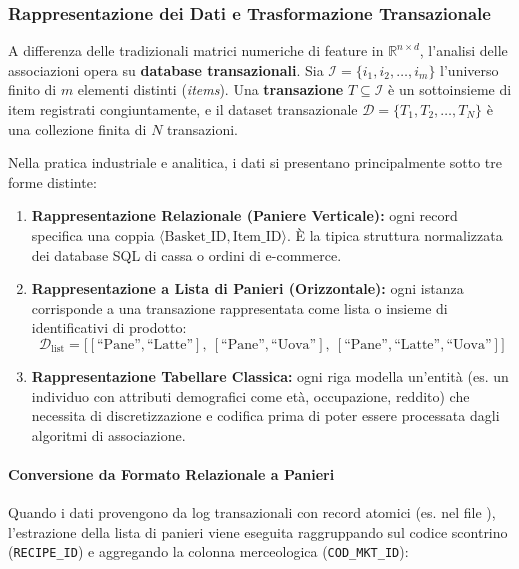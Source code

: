 \FloatBarrier
\subsubsection{Rappresentazione dei Dati e Trasformazione Transazionale}
\label{subsec:lab-data-representation}

A differenza delle tradizionali matrici numeriche di feature in $\mathbb{R}^{n \times d}$, l'analisi delle associazioni opera su \textbf{database transazionali}. Sia $\mathcal{I} = \{i_1, i_2, \dots, i_m\}$ l'universo finito di $m$ elementi distinti (\textit{items}). Una \textbf{transazione} $T \subseteq \mathcal{I}$ è un sottoinsieme di item registrati congiuntamente, e il dataset transazionale $\mathcal{D} = \{T_1, T_2, \dots, T_N\}$ è una collezione finita di $N$ transazioni.

Nella pratica industriale e analitica, i dati si presentano principalmente sotto tre forme distinte:
\begin{enumerate}
    \item \textbf{Rappresentazione Relazionale (Paniere Verticale):} ogni record specifica una coppia $\langle \text{Basket\_ID}, \text{Item\_ID} \rangle$. È la tipica struttura normalizzata dei database SQL di cassa o ordini di e-commerce.
    \item \textbf{Rappresentazione a Lista di Panieri (Orizzontale):} ogni istanza corrisponde a una transazione rappresentata come lista o insieme di identificativi di prodotto:
    \begin{equation}
        \mathcal{D}_{\text{list}} = \big[ [\text{``Pane''}, \text{``Latte''}],\ [\text{``Pane''}, \text{``Uova''}],\ [\text{``Pane''}, \text{``Latte''}, \text{``Uova''}] \big]
    \end{equation}
    \item \textbf{Rappresentazione Tabellare Classica:} ogni riga modella un'entità (es. un individuo con attributi demografici come età, occupazione, reddito) che necessita di discretizzazione e codifica prima di poter essere processata dagli algoritmi di associazione.
\end{enumerate}

\paragraph{Conversione da Formato Relazionale a Panieri}
Quando i dati provengono da log transazionali con record atomici (es. nel file ), l'estrazione della lista di panieri viene eseguita raggruppando sul codice scontrino (\texttt{RECIPE\_ID}) e aggregando la colonna merceologica (\texttt{COD\_MKT\_ID}):

